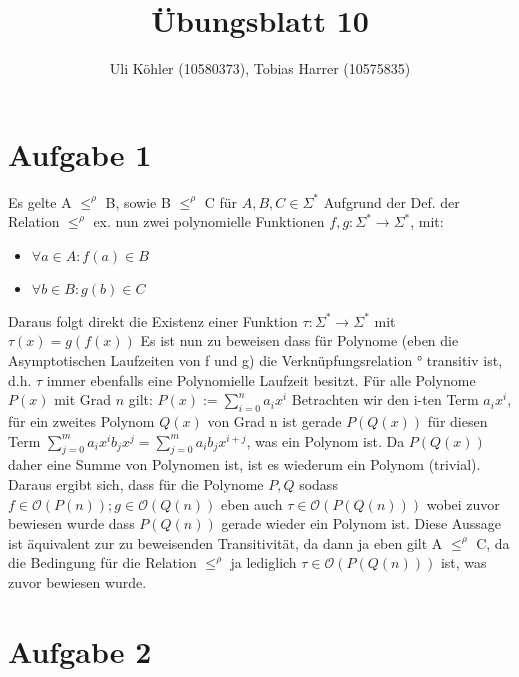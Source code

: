 \documentclass[a4paper,10pt,oneside,leqno]{scrartcl}
\title{Übungsblatt 10}
\author{Uli Köhler (10580373), Tobias Harrer (10575835)}
\begin{document}
\maketitle
\section*{Aufgabe 1}
Es gelte A $\leq^{\rho}$ B, sowie B $\leq^{\rho}$ C für $A,B,C \in \Sigma^*$
Aufgrund der Def. der Relation $\leq^{\rho}$ ex. nun zwei polynomielle Funktionen
$f, g : \Sigma^* \rightarrow \Sigma^*$, mit:
\begin{itemize}
 \item $\forall a \in A: f(a) \in B$
 \item $\forall b \in B: g(b) \in C$
\end{itemize}
Daraus folgt direkt die Existenz einer Funktion $\tau : \Sigma^* \rightarrow \Sigma^*$ mit $\tau(x) = g(f(x))$
Es ist nun zu beweisen dass für Polynome (eben die Asymptotischen Laufzeiten von f und g) die Verknüpfungsrelation ° transitiv ist,
d.h. $\tau$ immer ebenfalls eine Polynomielle Laufzeit besitzt.
Für alle Polynome $P(x)$ mit Grad $n$ gilt: $P(x) := \sum^n_{i=0}a_ix^i$
Betrachten wir den i-ten Term $a_ix^i$, für ein zweites Polynom $Q(x)$ von Grad n ist gerade
$P(Q(x))$ für diesen Term $\sum^m_{j=0}a_ix^ib_jx^j = \sum^m_{j=0}a_ib_jx^{i+j}$, was ein Polynom ist.
Da $P(Q(x))$ daher eine Summe von Polynomen ist, ist es wiederum ein Polynom (trivial).
Daraus ergibt sich, dass für die Polynome $P,Q$ sodass $f \in \mathcal{O}(P(n)) ; g \in \mathcal{O}(Q(n))$ eben auch
$\tau \in \mathcal{O}(P(Q(n)))$ wobei zuvor bewiesen wurde dass $P(Q(n))$ gerade wieder ein Polynom ist.
Diese Aussage ist äquivalent zur zu beweisenden Transitivität, da dann ja eben gilt A $\leq^{\rho}$ C,
da die Bedingung für die Relation $\leq^{\rho}$ ja lediglich  $\tau \in \mathcal{O}(P(Q(n)))$ ist, was zuvor bewiesen wurde.

\section*{Aufgabe 2}
\end{document}
